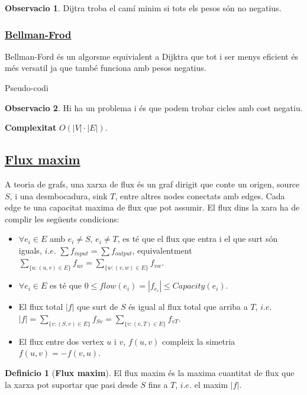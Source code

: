 \documentclass[12pt]{article}
\theoremstyle{definition}
\newtheorem{definicio}{Definicio}
\theoremstyle{definition}
\theoremstyle{definition}
\newtheorem{obs}{Observacio}
\theoremstyle{definition}
\theoremstyle{definition}
\theoremstyle{definition}
\theoremstyle{definition}
\begin{document}
\begin{obs}
Dijtra troba el camí minim si tots els pesos són no negatius.
\end{obs}

\subsubsection{\href{https://en.wikipedia.org/wiki/Bellman-Ford_algorithm}{\color{blue}\underline{Bellman-Frod}}}
Bellman-Ford és un algorsme equivialent a Dijktra que tot i ser menys eficient és més versatil ja que també funciona amb pesos negatius.

Pseudo-codi


\begin{obs}
Hi ha un problema i és que podem trobar cicles amb cost negatiu.
\end{obs}

\textbf{Complexitat} $O(|V|\cdot|E|)$.

\newpage

\subsection{\href{https://en.wikipedia.org/wiki/Maximum_flow_problem}{Flux maxim}}
A teoria de grafs, una xarxa de flux és un graf dirigit que conte un origen, source $S$, i una desmbocadura, sink $T$, entre altres nodes conectats amb edges.
Cada edge te una capacitat maxima de flux que pot assumir.
El flux dins la xara ha de complir les següents condicions:
\begin{itemize}
	\item $\forall e_i\in E$ amb $e_i\neq S$, $e_i\neq T$, es té que el flux que entra i el que surt són iguals, $i.e.$ $\sum f_{input}=\sum f_{output}$, equivalentment $\sum_{\{u:(u,v)\in E\}} f_{uv}=\sum_{\{w:(v,w)\in E\}} f_{vw}$.
	\item $\forall e_i\in E$ es té que $0\leq flow(e_i)=|f_{e_i}|\leq Capacity(e_i)$.
	\item El flux total $|f|$ que surt de $S$ és igual al flux total que arriba a $T$, $i.e.$ $|f| = \sum_{\{v:(S,v)\in E\}} f_{Sv} = \sum_{\{v:(v,T)\in E\}} f_{vT}$.
	\item El flux entre dos vertex $u$ i $v$, $f(u,v)$ compleix la simetria $f(u,v)=-f(v,u)$.
\end{itemize}

\begin{definicio}[\textbf{Flux maxim}]
El flux maxim és la maxima cuantitat de flux que la xarxa pot suportar que pasi desde $S$ fins a $T$, $i.e.$ el maxim $|f|$.
\end{definicio}
\end{document}

